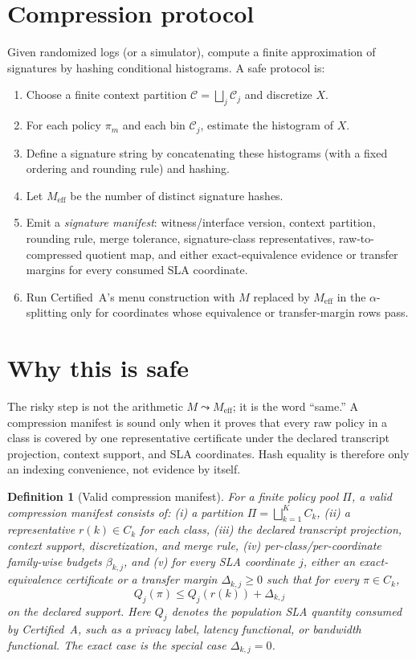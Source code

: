 \documentclass[11pt]{article}
\newtheorem{definition}{Definition}
\begin{document}
\section{Compression protocol}
Given randomized logs (or a simulator), compute a finite approximation of signatures by hashing conditional histograms.
A safe protocol is:
\begin{enumerate}[leftmargin=*]
\item Choose a finite context partition $\mathcal C=\bigsqcup_j \mathcal C_j$ and discretize $X$.
\item For each policy $\pi_m$ and each bin $\mathcal C_j$, estimate the histogram of $X$.
\item Define a signature string by concatenating these histograms (with a fixed ordering and rounding rule) and hashing.
\item Let $M_{\mathrm{eff}}$ be the number of distinct signature hashes.
\item Emit a \emph{signature manifest}: witness/interface version, context partition, rounding rule, merge tolerance, signature-class representatives, raw-to-compressed quotient map, and either exact-equivalence evidence or transfer margins for every consumed SLA coordinate.
\item Run Certified~A's menu construction with $M$ replaced by $M_{\mathrm{eff}}$ in the $\alpha$-splitting only for coordinates whose equivalence or transfer-margin rows pass.
\end{enumerate}

\section{Why this is safe}
The risky step is not the arithmetic $M\leadsto M_{\mathrm{eff}}$; it is the word ``same.''
A compression manifest is sound only when it proves that every raw policy in a class is covered by one representative certificate under the declared transcript projection, context support, and SLA coordinates.
Hash equality is therefore only an indexing convenience, not evidence by itself.

\begin{definition}[Valid compression manifest]
For a finite policy pool $\Pi$, a valid compression manifest consists of:
(i) a partition $\Pi=\bigsqcup_{k=1}^K C_k$,
(ii) a representative $r(k)\in C_k$ for each class,
(iii) the declared transcript projection, context support, discretization, and merge rule,
(iv) per-class/per-coordinate family-wise budgets $\beta_{k,j}$, and
(v) for every SLA coordinate $j$, either an exact-equivalence certificate or a transfer margin $\Delta_{k,j}\ge 0$ such that for every $\pi\in C_k$,
\[
Q_j(\pi)\le Q_j(r(k))+\Delta_{k,j}
\]
on the declared support.
Here $Q_j$ denotes the population SLA quantity consumed by Certified~A, such as a privacy label, latency functional, or bandwidth functional.
The exact case is the special case $\Delta_{k,j}=0$.
\end{definition}
\end{document}
